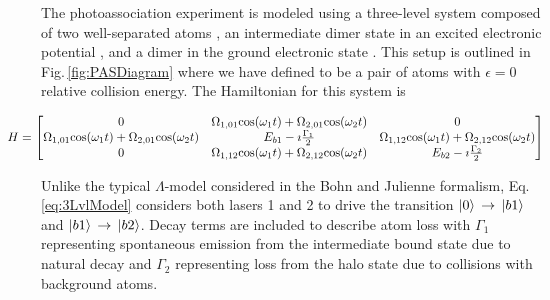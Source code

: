 The photoassociation experiment is modeled using a three-level system composed of two well-separated atoms , an intermediate dimer state in an excited electronic potential , and a dimer in the ground electronic state .
This setup is outlined in Fig.\,\ref{fig:PASDiagram} where we have defined  to be a pair of atoms with $\epsilon=0$ relative collision energy.
The Hamiltonian for this system is

\begin{equation} \label{eq:3LvlModel}
\hspace*{-1cm} 
	H=
    \begin{bmatrix}
      0 & \Omega_{1,01}\mathrm{cos}(\omega_1 t) + \Omega_{2,01}\mathrm{cos}(\omega_2 t) & 0 \\
      \Omega_{1,01}\mathrm{cos}(\omega_1 t)+ \Omega_{2,01}\mathrm{cos}(\omega_2 t) & E_{b1} - \imath \frac{\Gamma_1}{2} & \Omega_{1,12}\mathrm{cos}(\omega_1 t)+ \Omega_{2,12}\mathrm{cos}(\omega_2 t) \\
      0 & \Omega_{1,12}\mathrm{cos}(\omega_1 t)+ \Omega_{2,12}\mathrm{cos}(\omega_2 t) & E_{b2} - \imath \frac{\Gamma_2}{2} \\
    \end{bmatrix}
\end{equation}

\bigskip
Unlike the typical $\Lambda$-model considered in the Bohn and Julienne formalism, Eq.\,\ref{eq:3LvlModel} considers both lasers 1 and 2 to drive the transition $\left| {0} \right>\,\rightarrow\,\left| {b1} \right>$ and $\left| {b1} \right>\,\rightarrow\,\left| {b2} \right>$.
Decay terms are included to describe atom loss with $\Gamma_1$ representing spontaneous emission from the intermediate bound state due to natural decay and $\Gamma_2$ representing loss from the halo state due to collisions with background atoms.


